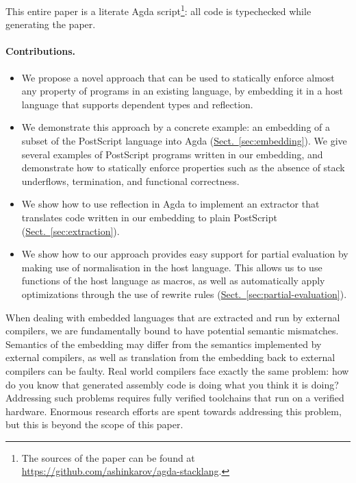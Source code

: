 \documentclass[sigplan,screen]{acmart}
\newcommand{\myref}[2]{\hyperref[#2]{#1~\ref*{#2}}}
\newcommand{\secref}[1]{\myref{Sect.}{sec:#1}}
\begin{document}

This entire paper is a literate Agda script\footnote{The sources of the paper
can be found at \url{https://github.com/ashinkarov/agda-stacklang}.}:
all code is typechecked while generating the paper.


\paragraph{Contributions.}
\begin{itemize}

\item We propose a novel approach that can be used to statically
  enforce almost any property of programs in an existing language, by
  embedding it in a host language that supports dependent types and
  reflection.

\item We demonstrate this approach by a concrete example: an embedding
  of a subset of the PostScript language into Agda
  (\secref{embedding}). We give several examples of PostScript
  programs written in our embedding, and demonstrate how to statically
  enforce properties such as the absence of stack underflows,
  termination, and functional correctness.

\item We show how to use reflection in Agda to implement an extractor
  that translates code written in our embedding to plain PostScript
  (\secref{extraction}).

\item We show how to our approach provides easy support for partial
  evaluation by making use of normalisation in the host language. This
  allows us to use functions of the host language as macros, as well
  as automatically apply optimizations through the use of rewrite
  rules (\secref{partial-evaluation}).
\end{itemize}

When dealing with embedded languages that are extracted and run
by external compilers, we are fundamentally bound to have potential
semantic mismatches.  Semantics of the embedding may differ from the
semantics implemented by external compilers, as well as translation from the
embedding back to external compilers can be faulty.  Real world compilers
face exactly the same problem: how do you know that generated assembly
code is doing what you think it is doing?  Addressing such problems
requires fully verified toolchains that run on a verified hardware.
Enormous research efforts are spent towards addressing this
problem, but this is beyond the scope of this paper.
\end{document}
